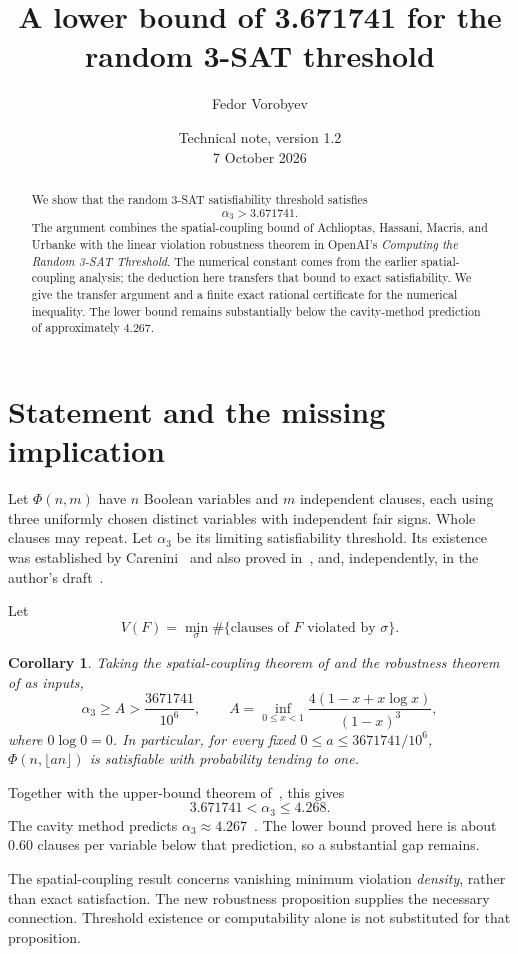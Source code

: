 \documentclass[11pt]{article}
\title{A lower bound of 3.671741 for the random 3-SAT threshold}
\author{Fedor Vorobyev}
\date{Technical note, version 1.2\\7 October 2026}
\newtheorem{corollary}{Corollary}
\begin{document}
\maketitle
\begin{abstract}
We show that the random 3-SAT satisfiability threshold satisfies
\[
 \alpha_3>3.671741.
\]
The argument combines the spatial-coupling bound of Achlioptas, Hassani,
Macris, and Urbanke with the linear violation robustness theorem in
OpenAI's \emph{Computing the Random 3-SAT Threshold}. The numerical
constant comes from the earlier spatial-coupling analysis; the deduction
here transfers that bound to exact satisfiability. We give the transfer
argument and a finite exact rational certificate for the numerical
inequality. The lower bound remains substantially below the
cavity-method prediction of approximately $4.267$.
\end{abstract}

\section{Statement and the missing implication}
Let $\Phi(n,m)$ have $n$ Boolean variables and $m$ independent clauses,
each using three uniformly chosen distinct variables with independent
fair signs. Whole clauses may repeat. Let $\alpha_3$ be its limiting
satisfiability threshold. Its existence was established by
Carenini~\cite{Carenini} and also proved in~\cite[Theorem 4.4]{OpenAI},
and, independently, in the author's draft~\cite[Theorem 1.1]{VorobyevExistence}.

Let
\[
 V(F)=\min_{\sigma}\#\{\text{clauses of }F\text{ violated by }\sigma\}.
\]
\begin{corollary}\label{thm:main}
Taking the spatial-coupling theorem of \cite{AHMU,HMU} and the robustness
theorem of \cite{OpenAI} as inputs,
\[
 \alpha_3\ge A>\frac{3671741}{10^6},
 \qquad
 A=\inf_{0\le x<1}\frac{4(1-x+x\log x)}{(1-x)^3},
\]
where $0\log0=0$. In particular, for every fixed
$0\le a\le3671741/10^6$, $\Phi(n,\lfloor an\rfloor)$ is satisfiable with
probability tending to one.
\end{corollary}

Together with the upper-bound theorem of~\cite{Vorobyev}, this gives
\[
 \boxed{3.671741<\alpha_3\le4.268.}
\]
The cavity method predicts $\alpha_3\approx4.267$~\cite{MMZ}.
The lower bound proved here is about $0.60$ clauses per variable below
that prediction, so a substantial gap remains.

The spatial-coupling result concerns vanishing minimum violation
\emph{density}, rather than exact satisfaction. The new robustness
proposition supplies the necessary connection. Threshold existence or
computability alone is not substituted for that proposition.
\end{document}
